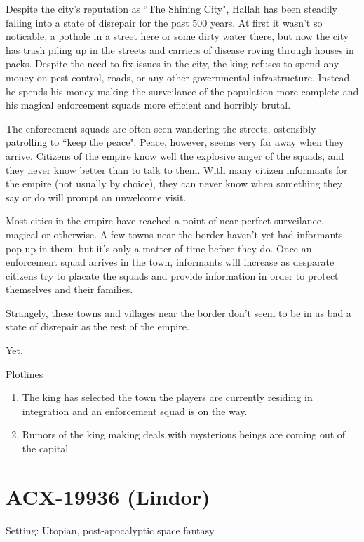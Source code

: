 Despite the city's reputation as ``The Shining City", Hallah has been steadily
falling into a state of disrepair for the past 500 years. At first it wasn't so
noticable, a pothole in a street here or some dirty water there, but now the
city has trash piling up in the streets and carriers of disease roving through
houses in packs. Despite the need to fix issues in the city, the king refuses
to spend any money on pest control, roads, or any other governmental
infrastructure. Instead, he spends his money making the surveilance of the
population more complete and his magical enforcement squads more efficient and
horribly brutal.

The enforcement squads are often seen wandering the streets, ostensibly
patrolling to ``keep the peace". Peace, however, seems very far away when they
arrive. Citizens of the empire know well the explosive anger of the squads, and
they never know better than to talk to them. With many citizen informants for
the empire (not usually by choice), they can never know when something they
say or do will prompt an unwelcome visit.

Most cities in the empire have reached a point of near perfect surveilance,
magical or otherwise. A few towns near the border haven't yet had informants
pop up in them, but it's only a matter of time before they do. Once an
enforcement squad arrives in the town, informants will increase as desparate
citizens try to placate the squads and provide information in order to protect
themselves and their families.

Strangely, these towns and villages near the border don't seem to be in as bad
a state of disrepair as the rest of the empire.

Yet.


Plotlines
\begin{enumerate}
    \item{The king has selected the town the players are currently residing in
          integration and an enforcement squad is on the way.}
    \item{Rumors of the king making deals with mysterious beings are coming out
          of the capital}
\end{enumerate}

\section*{ACX-19936 (Lindor)}

Setting: Utopian, post-apocalyptic space fantasy

